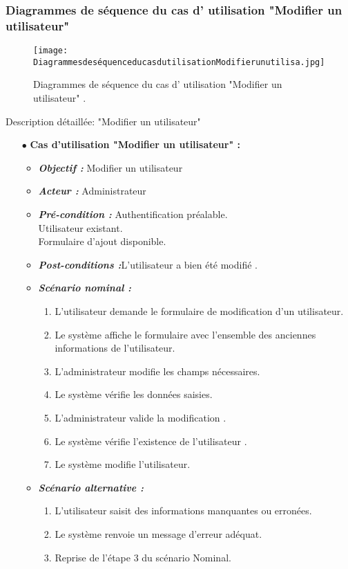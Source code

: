 \subsubsection{Diagrammes de séquence du cas d' utilisation "Modifier un utilisateur" }
\begin{figure}[ht]
	\centering
	\texttt{[image: DiagrammesdeséquenceducasdutilisationModifierunutilisa.jpg]}
	\caption{Diagrammes de séquence du cas d' utilisation "Modifier un utilisateur"  .}
	\label{fig:Diagrammes de séquence du cas d' utilisation Modifier un utilisateur }
\end{figure}
\FloatBarrier

{\Large \color{cyan} Description détaillée: "Modifier un utilisateur"}
\begin{itemize}
	\item[$\bullet$] \textbf{Cas d’utilisation "Modifier un utilisateur" :} 
	\medskip
	\begin{itemize}
		\item \textit{\textbf{Objectif :}} Modifier un utilisateur 	
		\item \textit{\textbf{Acteur :}} Administrateur	
		\item \textit{\textbf{Pré-condition  :}} Authentification préalable.\\
		Utilisateur existant.\\
		Formulaire d’ajout disponible.
\\
		\item \textit{\textbf{Post-conditions   :}}L’utilisateur a bien été modifié .
		\item \textit{\textbf{Scénario nominal :}}
		\begin{enumerate}
			\item L’utilisateur demande le formulaire de modification d’un utilisateur.
			\item Le système affiche le formulaire avec l’ensemble des anciennes informations de l’utilisateur.
			\item L’administrateur modifie les champs nécessaires. 
			\item Le système vérifie les données saisies. 
			\item L’administrateur valide la modification . 
			\item Le système vérifie l’existence de l’utilisateur .  
			\item Le système modifie l’utilisateur.
		\end{enumerate}
		\item \textit{\textbf{Scénario alternative :}}
		\begin{enumerate}
			\item L’utilisateur saisit des informations manquantes ou erronées.
			\item  Le système renvoie un message d’erreur adéquat.
			\item Reprise de l’étape 3 du scénario Nominal.
		\end{enumerate}
	\end{itemize}
\end{itemize}	
